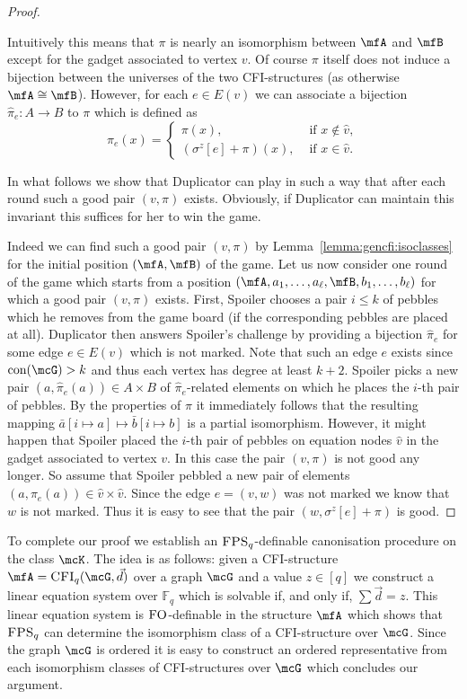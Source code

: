 \documentclass[a4paper,UKenglish]{lipics}
\newcommand{\isom}{\cong}
\newcommand{\inseg}[1]{\ensuremath{[#1]}}
\newcommand{\field}[1]{\mathbb{#1}}
\newcommand{\con}{\ensuremath{\text{con}}\xspace}
\newcommand{\logic}[1]{\ensuremath{\textsc{#1}}\xspace}
\newcommand{\FO}{\logic{FO}}
\newcommand{\FPSx}[1]{\ensuremath{\logic{FPS}_{#1}}\xspace}
\newcommand{\ba}{{\bar a}}
\newcommand{\bb}{{\bar b}}
\theoremstyle{plain}
\begin{document}
\begin{proof}
\begin{itemize}
\end{itemize}
Intuitively this means that $\pi$ is nearly an isomorphism between $\mfA$ 
and $\mfB$ except for the gadget associated to vertex $v$.
Of course $\pi$ itself does not induce a bijection between the universes 
of the two CFI-structures (as otherwise $\mfA \isom \mfB$).
However, for each $e \in E(v)$ we can associate a bijection $\hat \pi_e: 
A \to B$ to $\pi$ which is defined as
\[ \hat \pi_e (x) = \begin{cases}
                   \pi(x) ,&\text{ if } x \nin \hat v,\\
                   (\sigma^z[e]+ \pi)(x) ,&\text{ if } x \in \hat v.
                  \end{cases}
\]

In what follows we show that Duplicator can play in such a way that 
after each round such a good pair $(v, \pi)$ exists. Obviously, if Duplicator 
can 
maintain this invariant this suffices for her to win the game.

Indeed we can find such a good pair $(v,\pi)$ 
by Lemma~\ref{lemma:gencfi:isoclasses} for the initial position $(\mfA, \mfB)$ 
of the game.
Let us now consider one round of the game which starts from a 
position $(\mfA, a_1, \dots, a_\ell, \mfB, b_1, \dots, b_\ell)$ for which a 
good 
pair $(v,\pi)$ exists.
First, Spoiler chooses a pair $i \leq k$ of pebbles which he removes from the 
game board (if the corresponding pebbles are placed at all). 
Duplicator then answers Spoiler's challenge by providing a bijection 
$\hat \pi_e$ for some edge $e \in E(v)$ which is not marked. 
Note that such an edge $e$ exists since $\con(\mcG) > k$ and thus each 
vertex has degree at least $k + 2$.
Spoiler picks a new pair $(a, \hat \pi_e(a)) \in A \times B$ of $\hat 
\pi_e$-related elements on which he places the $i$-th pair of pebbles.
By the properties of $\pi$ it immediately follows that the resulting mapping 
$\ba[i\mapsto a] \mapsto \bb[i \mapsto b]$ is a partial isomorphism. 
However, it might happen that Spoiler placed the $i$-th pair of pebbles on 
equation nodes $\hat v$ in the gadget associated to vertex $v$. In this case 
the 
pair $(v, \pi)$ is not good any longer.
So assume that Spoiler pebbled a new pair of elements $(a, \pi_e(a)) \in 
\hat v \times \hat v$.
Since the edge $e = (v,w)$ was not marked we know that $w$ is not 
marked.
Thus it is easy to see that the 
pair $(w, \sigma^z[e] +  \pi)$ is good. 
\end{proof}

To complete our proof we establish an $\FPSx q$-definable 
canonisation procedure on the class $\mcK$. 
The idea is as follows: given a CFI-structure $\mfA = \CFI(\mcG,\vec d)$ 
over a graph $\mcG$ and a value $z \in \inseg q$ we construct a 
linear equation system over $\field F_q$ which is solvable if, 
and only if, $\sum \vec d = z$. This linear equation system 
is $\FO$-definable in the structure $\mfA$ which shows that $\FPSx q$ can 
determine the isomorphism class of a CFI-structure over $\mcG$. Since the 
graph $\mcG$ is ordered it is easy to construct an ordered
representative from each isomorphism classes of CFI-structures over $\mcG$ 
which concludes our argument.
\end{document}

